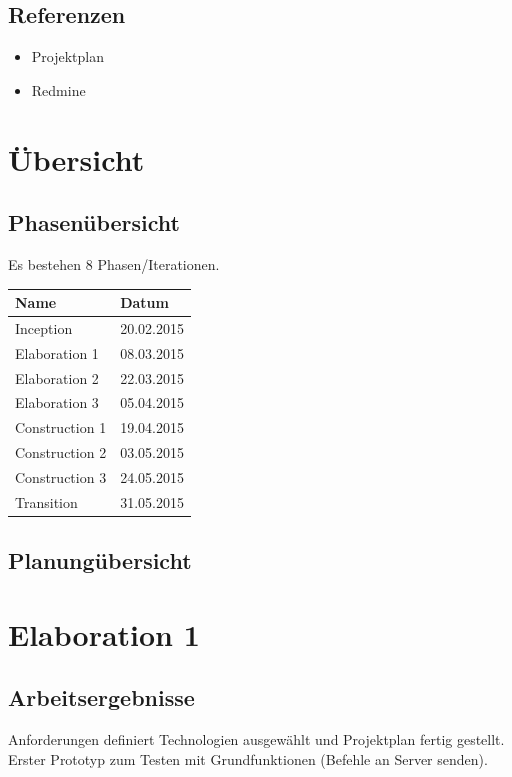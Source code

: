 \documentclass[11pt]{scrartcl}
\begin{document}
\subsection{Referenzen}
\begin{itemize}
  \item Projektplan
  \item Redmine
\end{itemize}
\section{Übersicht}
\subsection{Phasenübersicht}
Es bestehen 8 Phasen/Iterationen.

\begin{tabularx}{\linewidth}{X X}
  \bf{Name} & \bf{Datum} \\
  \hline
  Inception & 20.02.2015 \\
  Elaboration 1 & 08.03.2015 \\
  Elaboration 2 & 22.03.2015 \\
  Elaboration 3 & 05.04.2015 \\
  Construction 1 & 19.04.2015 \\
  Construction 2 & 03.05.2015 \\
  Construction 3 & 24.05.2015 \\
  Transition 	& 31.05.2015 \\
\end{tabularx}
\subsection{Planungübersicht}

\section{Elaboration 1}
\subsection{Arbeitsergebnisse}
Anforderungen definiert Technologien ausgewählt und Projektplan 
fertig gestellt. \newline Erster Prototyp 
zum Testen mit Grundfunktionen (Befehle an Server senden).
\end{document}
